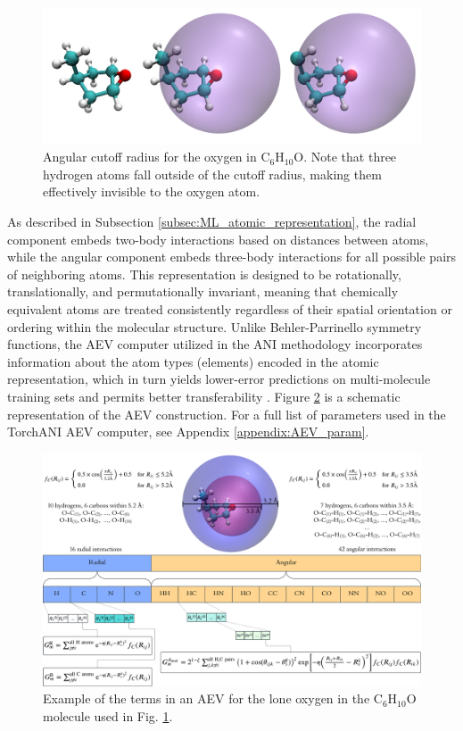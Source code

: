 \begin{figure}[h!]
    \centering
    \includegraphics[width=1\linewidth]{Images/aev_radius/aev_radius_combined.png}
    \caption[Demonstration of AEV angular cutoff radius.]{Angular cutoff radius for the oxygen in C$_6$H$_{10}$O. Note that three hydrogen atoms fall outside of the cutoff radius, making them effectively invisible to the oxygen atom.}
    \label{fig:aev_radius}
\end{figure}

As described in Subsection \ref{subsec:ML_atomic_representation}, the radial component embeds two-body interactions based on distances between atoms, while the angular component embeds three-body interactions for all possible pairs of neighboring atoms.
This representation is designed to be rotationally, translationally, and permutationally invariant, meaning that chemically equivalent atoms are treated consistently regardless of their spatial orientation or ordering within the molecular structure.
Unlike Behler-Parrinello symmetry functions, the AEV computer utilized in the ANI methodology incorporates information about the atom types (elements) encoded in the atomic representation, which in turn yields lower-error predictions on multi-molecule training sets and permits better transferability \cite{ani-1}.
Figure \ref{fig:aev_construction} is a schematic representation of the AEV construction. 
For a full list of parameters used in the TorchANI AEV computer, see Appendix \ref{appendix:AEV_param}.

\begin{figure}[hb]
    \centering
    \includegraphics[width=1\linewidth]{Images/aev_radius/AEV_construction.png}
    \caption[Example of atomic environment vector construction]{Example of the terms in an AEV for the lone oxygen in the C$_6$H$_{10}$O molecule used in Fig. \ref{fig:aev_radius}. }
    \label{fig:aev_construction}
\end{figure}

